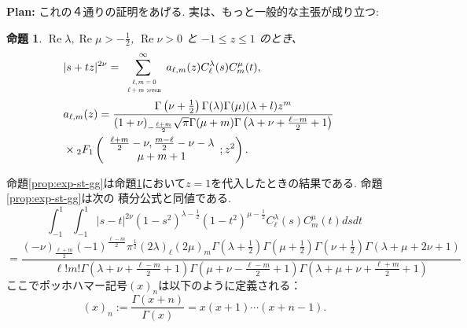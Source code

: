 \documentclass[12pt]{article} %
\newtheorem{prop}{命題}
\theoremstyle{remark}
\newcommand{\tmop}[1]{\ensuremath{\operatorname{#1}}}
\newenvironment{taggedprop}[1]
 {\renewcommand\thetaggedpropx{#1}\taggedpropx}
  {\endtaggedpropx}
\begin{document}
	{\bf Plan:} これの４通りの証明をあげる.
	実は、もっと一般的な主張が成り立つ:
	\begin{prop}\label{prop:exp-stz-gg}
		  \label{thm:4}$\tmop{Re} \lambda, \tmop{Re} \mu > - \frac{1}{2}$,
		    $\tmop{Re} \nu > 0$ と $-1 \leqslant z \leqslant 1$ のとき、
		      \begin{eqnarray}
			      & | s + t z |^{2 \nu}  = \sum_{\scalebox{0.6}{
				      $\begin{array}[]{c}
						  \ell,m=0\\\ell+ m\mbox{ :even}
					  \end{array}
				  $}}^{\infty} a_{\ell, m}
					          (z) C_\ell^{\lambda} (s) C_m^{\mu} (t), &  \nonumber\\
						      & a_{\ell, m} (z) = \frac{\Gamma \left( \nu + \frac{1}{2} \right) \Gamma
						      (\lambda) \Gamma (\mu) (\lambda + l) z^m }{(1 + \nu)_{- \frac{\ell + m}{2}} \sqrt{\pi} \Gamma
										      (\mu + m) \Gamma \left( \lambda + \nu + \frac{\ell - m}{2} + 1 \right)}&\nonumber
										      \\&\times{}_2 F_1 \left( \begin{array}{c}
								        \frac{\ell + m}{2} - \nu, \frac{m - \ell}{2} - \nu - \lambda\\
									      \mu + m + 1
									          \end{array} ; z^2 \right). & 
										          \nonumber
											    \end{eqnarray}
    \end{prop}
    命題\ref{prop:exp-st-gg}は命題\ref{prop:exp-stz-gg}において$z=1$を代入したときの結果である.
	命題\ref{prop:exp-st-gg}は次の
	積分公式と同値である.
	\begin{taggedprop}{$\;\mathbf{1'}$}
		\label{prop:int-st-gg}
		\begin{equation*}
			\int_{- 1}^1 \int_{- 1}^1 | s - t |^{2 \nu} (1 - s^2)^{\lambda - \frac{1}{2}}
			(1 - t^2)^{\mu - \frac{1}{2}} C_\ell^{\lambda} (s) C_m^{\mu} (t) d s d t
		\end{equation*}
		{\scriptsize
		\begin{equation}
			=\frac{(- \nu)_{\frac{\ell + m}{2}} (- 1)^{\frac{\ell - m}{2}} \pi^{\frac{1}{2}} (2
			\lambda)_\ell (2 \mu)_m \Gamma \left( \lambda + \frac{1}{2} \right) \Gamma \left(
			\mu + \frac{1}{2} \right) \Gamma \left( \nu + \frac{1}{2} \right) \Gamma
		(\lambda + \mu + 2 \nu + 1)}{\ell!m! \Gamma \left( \lambda + \nu + \frac{\ell -
		m}{2} + 1 \right) \Gamma \left( \mu + \nu - \frac{\ell - m}{2} + 1 \right) \Gamma
		\left( \lambda + \mu + \nu + \frac{\ell + m}{2} + 1 \right)}
			\label{eqn:int-st-gg}
			\tag{1$'$}
		\end{equation}
		}
	\end{taggedprop}
	ここでポッホハマー記号$(x)_n$は以下のように定義される：\begin{equation*}
		(x)_n:=\frac{\Gamma(x+n)}{\Gamma(x)}=x(x+1)\cdots(x+n-1).
	\end{equation*}
\end{document}
